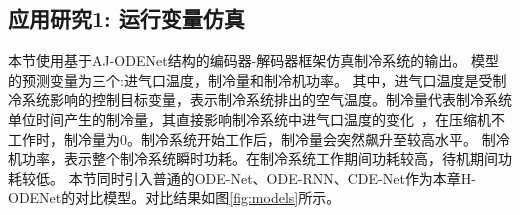 \subsection{应用研究1: 运行变量仿真}
\label{sec:case-study1}
本节使用基于AJ-ODENet结构的编码器-解码器框架仿真制冷系统的输出。
模型的预测变量为三个:进气口温度，制冷量和制冷机功率。
其中，进气口温度是受制冷系统影响的控制目标变量，表示制冷系统排出的空气温度。制冷量代表制冷系统单位时间产生的制冷量，其直接影响制冷系统中进气口温度的变化~\cite{alonso2020estimating}，在压缩机不工作时，制冷量为0。制冷系统开始工作后，制冷量会突然飙升至较高水平。
制冷机功率，表示整个制冷系统瞬时功耗。在制冷系统工作期间功耗较高，待机期间功耗较低。
本节同时引入普通的ODE-Net、ODE-RNN\cite{10.5555/3454287.3454765}、CDE-Net\cite{kidger2020neural}作为本章H-ODENet的对比模型。对比结果如图\ref{fig:models}所示。
